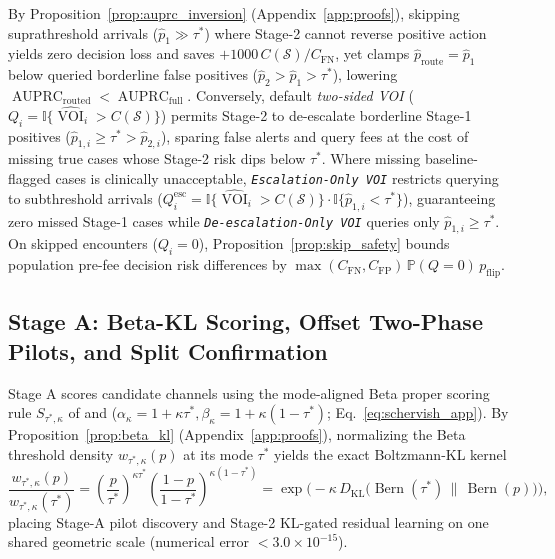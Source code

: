 \documentclass[11pt]{article}
\theoremstyle{remark}
\begin{document}
By Proposition~\ref{prop:auprc_inversion} (Appendix~\ref{app:proofs}), skipping suprathreshold arrivals ($\hat{p}_1 \gg \tau^*$) where Stage-2 cannot reverse positive action yields zero decision loss and saves $+1000\,C(\mathcal{S})/C_{\text{FN}}$, yet clamps $\hat{p}_{\text{route}}=\hat{p}_1$ below queried borderline false positives ($\hat{p}_2 > \hat{p}_1 > \tau^*$), lowering $\operatorname{AUPRC}_{\text{routed}} < \operatorname{AUPRC}_{\text{full}}$. Conversely, default \emph{two-sided VOI} ($Q_i = \mathbb{I}\{\widehat{\operatorname{VOI}}_i > C(\mathcal{S})\}$) permits Stage-2 to de-escalate borderline Stage-1 positives ($\hat{p}_{1,i} \ge \tau^* > \hat{p}_{2,i}$), sparing false alerts and query fees at the cost of missing true cases whose Stage-2 risk dips below $\tau^*$. Where missing baseline-flagged cases is clinically unacceptable, \emph{\texttt{Escalation-Only VOI}} restricts querying to subthreshold arrivals ($Q_i^{\text{esc}} = \mathbb{I}\{\widehat{\operatorname{VOI}}_i > C(\mathcal{S})\} \cdot \mathbb{I}\{\hat{p}_{1,i} < \tau^*\}$), guaranteeing zero missed Stage-1 cases while \emph{\texttt{De-escalation-Only VOI}} queries only $\hat{p}_{1,i} \ge \tau^*$. On skipped encounters ($Q_i = 0$), Proposition~\ref{prop:skip_safety} bounds population pre-fee decision risk differences by $\max(C_{\text{FN}}, C_{\text{FP}})\,\mathbb{P}(Q=0)\,p_{\text{flip}}$.

\subsection{Stage A: Beta-KL Scoring, Offset Two-Phase Pilots, and Split Confirmation}
\label{sec:breslow_cain}

Stage A scores candidate channels using the mode-aligned Beta proper scoring rule $S_{\tau^*,\kappa}$ of \citet{schervish1989general} and \citet{buja2005loss} ($\alpha_\kappa = 1+\kappa\tau^*, \beta_\kappa = 1+\kappa(1-\tau^*)$; Eq.~\eqref{eq:schervish_app}). By Proposition~\ref{prop:beta_kl} (Appendix~\ref{app:proofs}), normalizing the Beta threshold density $w_{\tau^*,\kappa}(p)$ at its mode $\tau^*$ yields the exact Boltzmann-KL kernel
\begin{equation}
  \frac{w_{\tau^*,\kappa}(p)}{w_{\tau^*,\kappa}(\tau^*)} = \left(\frac{p}{\tau^*}\right)^{\kappa\tau^*}\!\left(\frac{1-p}{1-\tau^*}\right)^{\kappa(1-\tau^*)} = \exp\!\Big(-\kappa\, D_{\text{KL}}\big(\operatorname{Bern}(\tau^*) \,\|\, \operatorname{Bern}(p)\big)\Big),
  \label{eq:beta_kl_main}
\end{equation}
placing Stage-A pilot discovery and Stage-2 KL-gated residual learning on one shared geometric scale (numerical error $< 3.0\times 10^{-15}$).
\end{document}
